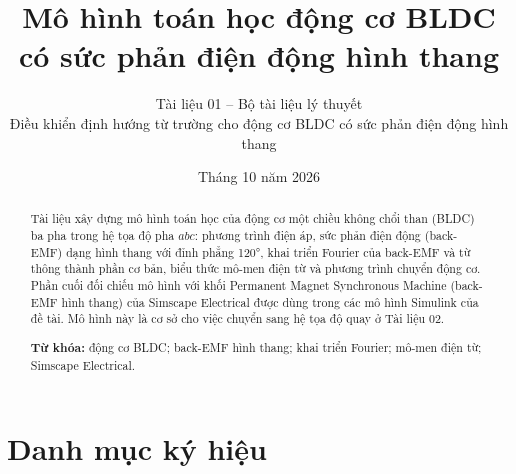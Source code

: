 \documentclass[11pt,a4paper]{article}
\title{\vspace{-1.2cm}\textbf{Mô hình toán học động cơ BLDC có sức phản điện động hình thang}}
\author{\normalsize Tài liệu 01 -- Bộ tài liệu lý thuyết\\[2pt]
\small Điều khiển định hướng từ trường cho động cơ BLDC có sức phản điện động hình thang}
\date{\small Tháng 10 năm 2026}
\begin{document}
\maketitle

\begin{abstract}
\noindent Tài liệu xây dựng mô hình toán học của động cơ một chiều không chổi than (BLDC) ba pha trong hệ tọa độ pha $abc$: phương trình điện áp, sức phản điện động (back-EMF) dạng hình thang với đỉnh phẳng 120°, khai triển Fourier của back-EMF và từ thông thành phần cơ bản, biểu thức mô-men điện từ và phương trình chuyển động cơ. Phần cuối đối chiếu mô hình với khối Permanent Magnet Synchronous Machine (back-EMF hình thang) của Simscape Electrical được dùng trong các mô hình Simulink của đề tài. Mô hình này là cơ sở cho việc chuyển sang hệ tọa độ quay ở Tài liệu 02.

\vspace{0.5em}
\noindent\textbf{Từ khóa:} động cơ BLDC; back-EMF hình thang; khai triển Fourier; mô-men điện từ; Simscape Electrical.
\end{abstract}


\tableofcontents
\newpage

\section*{Danh mục ký hiệu}
\end{document}
